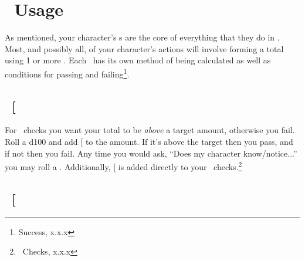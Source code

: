 \section{\attribute\ Usage}
As mentioned, your character's \attribute s are the core of everything that they do in \gametitle. Most, and possibly all, of your character's actions will involve forming a total using 1 or more \attribute . Each \attribute\ has its own method of being calculated as well as conditions for passing and failing\footnote{Success, x.x.x}. 


\subsection{\KNOWful\ {[}\KNOW\index{\attribute!\KNOWful}{]}}


\noindent For \KNOWful\  checks you want your total to be \textit{above} a target amount, otherwise you fail.
\noindent Roll a d100 and add {[}\KNOW{]} to the amount. If it's above the target then you pass, and if not then you fail.
\fillrlinemid
\noindent Any time you would ask, ``Does my character know/notice...''
you may roll a \KNOW. Additionally, {[}\KNOW{]} is added directly to your \skill\ checks.\footnote{\skill\ Checks, x.x.x}


\subsection{\POWEful\ {[}\POWE\index{\attribute!\POWEful}{]}}


